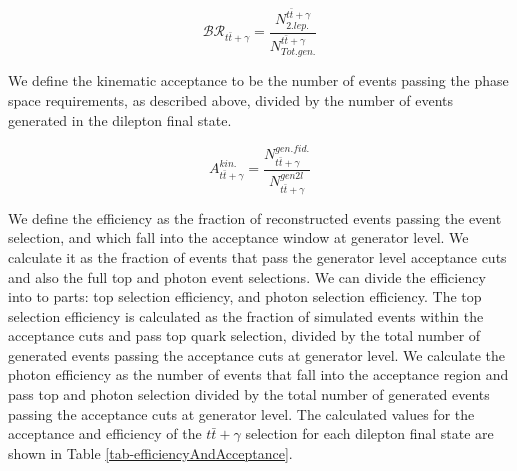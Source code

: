 \begin{equation}
\mathcal{BR}_{t\bar{t}+\gamma} = \frac{N_{2. lep.}^{t\bar{t}+\gamma}}{N_{Tot. gen.}^{t\bar{t}+\gamma}}
\end{equation} 

We define the kinematic acceptance to be the number of events passing the phase space requirements, as described above, divided by the number of events generated in the dilepton final state.

\begin{equation}
A_{t\bar{t}+\gamma}^{kin.} = \frac{N_{t\bar{t}+\gamma}^{gen. fid.}}{N_{t\bar{t}+\gamma}^{gen 2l}}
\end{equation} 


We define the efficiency as the fraction of reconstructed events passing the event selection, and which fall into the acceptance window at generator level. We calculate it as the fraction of events that pass the generator level acceptance cuts and also the full top and photon event selections. We can divide the efficiency into to parts: top selection efficiency, and photon selection efficiency. The top selection efficiency is calculated as the fraction of simulated events within the acceptance cuts and pass top quark selection, divided by the total number of generated events passing the acceptance cuts at generator level. We calculate the photon efficiency as the number of events that fall into the acceptance region and pass top and photon selection divided by the total number of generated events passing the acceptance cuts at generator level. The calculated values for the acceptance and efficiency of the $t\bar{t}+\gamma$ selection for each dilepton final state are shown in Table \ref{tab-efficiencyAndAcceptance}.


